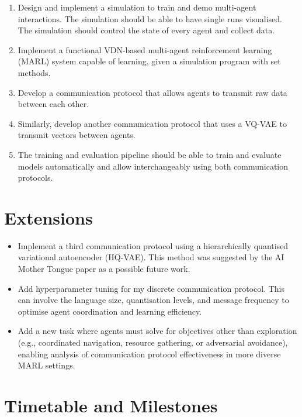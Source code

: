 \documentclass[20pt]{article}
\begin{document}
\begin{enumerate}
\item Design and implement a simulation to train and demo multi-agent interactions. The simulation should be able to have single runs visualised. The simulation should control the state of every agent and collect data.
\item Implement a functional VDN-based multi-agent reinforcement learning (MARL) system capable of learning, given a simulation program with set methods.
\item Develop a communication protocol that allows agents to transmit raw data between each other.
\item Similarly, develop another communication protocol that uses a VQ-VAE  to transmit vectors between agents.
\item The training and evaluation pipeline should be able to train and evaluate models automatically and allow interchangeably using both communication protocols.
\end{enumerate}


\section{Extensions}

\begin{itemize}
\item Implement a third communication protocol using a hierarchically quantised variational autoencoder (HQ-VAE). This method was suggested by the AI Mother Tongue paper as a possible future work.
\item Add hyperparameter tuning for my discrete communication protocol. This can involve the language size, quantisation levels, and message frequency to optimise agent coordination and learning efficiency.
\item Add a new task where agents must solve for objectives other than exploration (e.g., coordinated navigation, resource gathering, or adversarial avoidance), enabling analysis of communication protocol effectiveness in more diverse MARL settings.
\end{itemize}

\pagebreak

\section{Timetable and Milestones}
\end{document}
